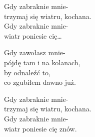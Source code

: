 \begin{text}
    Gdy zabraknie mnie-\\
    trzymaj się wiatru, kochana.\\
    Gdy zabraknie mnie-\\
    wiatr poniesie cię…

    Gdy zawołasz mnie-\\
    pójdę tam i na kolanach,\\
    by odnaleźć to,\\
    co zgubiłem dawno już.

    Gdy zabraknie mnie-\\
    trzymaj się wiatru, kochana.\\
    Gdy zabraknie mnie-\\
    wiatr poniesie cię znów.
\end{text}
\begin{chord}

\end{chord}